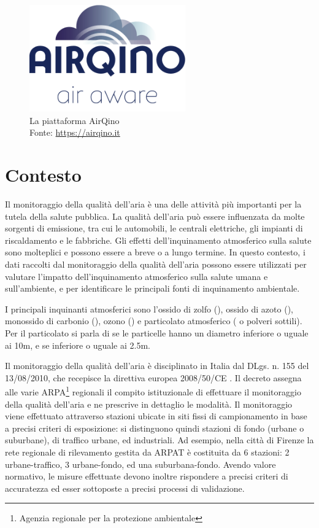\vspace{3mm}
\begin{figure}[H]
\centering
\captionsetup{justification=centering}
\includegraphics[width=0.60\textwidth,height=\textheight,keepaspectratio]{img/airqino}
\caption{La piattaforma AirQino\\Fonte: \url{https://airqino.it}}
\label{fig:airqino}
\end{figure}

\section{Contesto}\label{sec:contesto}
Il monitoraggio della qualità dell'aria è una delle attività più importanti per la tutela della salute pubblica. La qualità dell'aria può essere influenzata da molte sorgenti di emissione, tra cui le automobili, le centrali elettriche, gli impianti di riscaldamento e le fabbriche. Gli effetti dell'inquinamento atmosferico sulla salute sono molteplici e possono essere a breve o a lungo termine. In questo contesto, i dati raccolti dal monitoraggio della qualità dell'aria possono essere utilizzati per valutare l'impatto dell'inquinamento atmosferico sulla salute umana e sull'ambiente, e per identificare le principali fonti di inquinamento ambientale.

I principali inquinanti atmosferici sono l'ossido di zolfo (), ossido di azoto (), monossido di carbonio (), ozono () e particolato atmosferico ( o polveri sottili). Per il particolato si parla di  se le particelle hanno un diametro inferiore o uguale ai 10\textmu m, e  se inferiore o uguale ai 2.5\textmu m.

Il monitoraggio della qualità dell’aria è disciplinato in Italia dal DLgs. n. 155 del 13/08/2010, che recepisce la direttiva europea 2008/50/CE \cite{direttiva}. Il decreto assegna alle varie ARPA\footnote{Agenzia regionale per la protezione ambientale} regionali il compito istituzionale di effettuare il monitoraggio della qualità dell’aria e ne prescrive in dettaglio le modalità. Il monitoraggio viene effettuato attraverso stazioni ubicate in siti fissi di campionamento in base a precisi criteri di esposizione: si distinguono quindi stazioni di fondo (urbane o suburbane), di traffico urbane, ed industriali. Ad esempio, nella città di Firenze la rete regionale di rilevamento gestita da ARPAT \cite{arpat} è costituita da 6 stazioni: 2 urbane-traffico, 3 urbane-fondo, ed una suburbana-fondo. Avendo valore normativo, le misure effettuate devono inoltre rispondere a precisi criteri di accuratezza ed esser sottoposte a precisi processi di validazione. \cite{relazione_alice}

